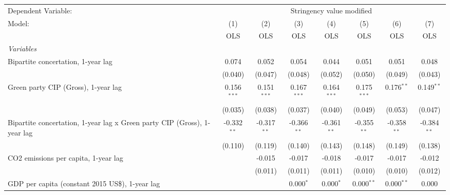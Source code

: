
\begingroup
\centering
\begin{tabular}{lccccccc}
   \toprule
   Dependent Variable: & \multicolumn{7}{c}{Stringency value modified}\\
   Model:                                                                   & (1)           & (2)           & (3)           & (4)           & (5)           & (6)           & (7)\\  
                                                                            &  OLS          & OLS           & OLS           & OLS           & OLS           & OLS           & OLS\\  
   \midrule
   \emph{Variables}\\
   Bipartite concertation, 1-year lag                                       & 0.074         & 0.052         & 0.054         & 0.044         & 0.051         & 0.051         & 0.048\\   
                                                                            & (0.040)       & (0.047)       & (0.048)       & (0.052)       & (0.050)       & (0.049)       & (0.043)\\   
   Green party CIP (Gross), 1-year lag                                      & 0.156$^{***}$ & 0.151$^{***}$ & 0.167$^{***}$ & 0.164$^{***}$ & 0.175$^{***}$ & 0.176$^{**}$  & 0.149$^{**}$\\   
                                                                            & (0.035)       & (0.038)       & (0.037)       & (0.040)       & (0.049)       & (0.053)       & (0.047)\\   
   Bipartite concertation, 1-year lag x Green party CIP (Gross), 1-year lag & -0.332$^{**}$ & -0.317$^{**}$ & -0.366$^{**}$ & -0.361$^{**}$ & -0.355$^{**}$ & -0.358$^{**}$ & -0.384$^{**}$\\   
                                                                            & (0.110)       & (0.119)       & (0.140)       & (0.143)       & (0.148)       & (0.149)       & (0.138)\\   
   CO2 emissions per capita, 1-year lag                                     &               & -0.015        & -0.017        & -0.018        & -0.017        & -0.017        & -0.012\\   
                                                                            &               & (0.011)       & (0.011)       & (0.011)       & (0.010)       & (0.010)       & (0.012)\\   
   GDP per capita (constant 2015 US\$), 1-year lag                          &               &               & 0.000$^{*}$   & 0.000$^{*}$   & 0.000$^{**}$  & 0.000$^{**}$  & 0.000\\   

\end{tabular}
